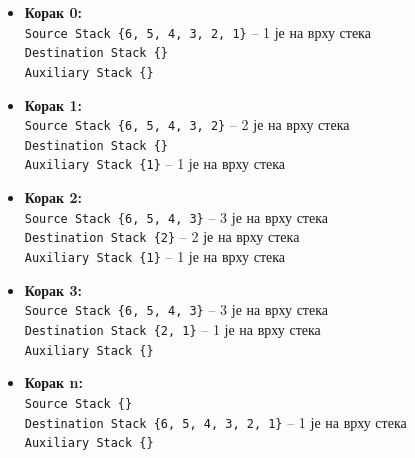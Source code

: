 \begin{itemize}
	\item \textbf{Корак 0:} \\
		  \texttt{Source Stack \{6, 5, 4, 3, 2, 1\}} -- 1 је на врху стека \\
		  \texttt{Destination Stack \{\}} \\
		  \texttt{Auxiliary Stack \{\}}
	\item \textbf{Корак 1:} \\
		  \texttt{Source Stack \{6, 5, 4, 3, 2\}} -- 2 је на врху стека \\
		  \texttt{Destination Stack \{\}} \\
		  \texttt{Auxiliary Stack \{1\}} -- 1 је на врху стека
	\item \textbf{Корак 2:} \\
		  \texttt{Source Stack \{6, 5, 4, 3\}} -- 3 је на врху стека \\
		  \texttt{Destination Stack \{2\}} -- 2 је на врху стека \\
		  \texttt{Auxiliary Stack \{1\}} -- 1 је на врху стека
	\item \textbf{Корак 3:} \\
		  \texttt{Source Stack \{6, 5, 4, 3\}} -- 3 је на врху стека \\
		  \texttt{Destination Stack \{2, 1\}} -- 1 је на врху стека \\
		  \texttt{Auxiliary Stack \{\}}
	\item \textbf{Корак n:} \\
		  \texttt{Source Stack \{\}} \\
		  \texttt{Destination Stack \{6, 5, 4, 3, 2, 1\}} -- 1 је на врху стека \\
		  \texttt{Auxiliary Stack \{\}}
\end{itemize}

